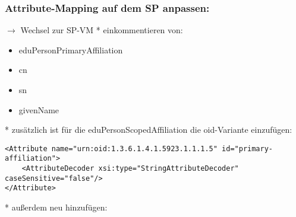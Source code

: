 \subsubsection*{Attribute-Mapping auf dem SP anpassen:}
$\rightarrow$ Wechsel zur SP-VM
* einkommentieren von:
\begin{itemize}
\item eduPersonPrimaryAffiliation
\item cn
\item sn
\item givenName
\end{itemize}
* zusätzlich ist für die eduPersonScopedAffiliation die oid-Variante einzufügen:
\begin{lstlisting}	
<Attribute name="urn:oid:1.3.6.1.4.1.5923.1.1.1.5" id="primary-affiliation">
	<AttributeDecoder xsi:type="StringAttributeDecoder" caseSensitive="false"/>
</Attribute>
\end{lstlisting}
* außerdem neu hinzufügen:
